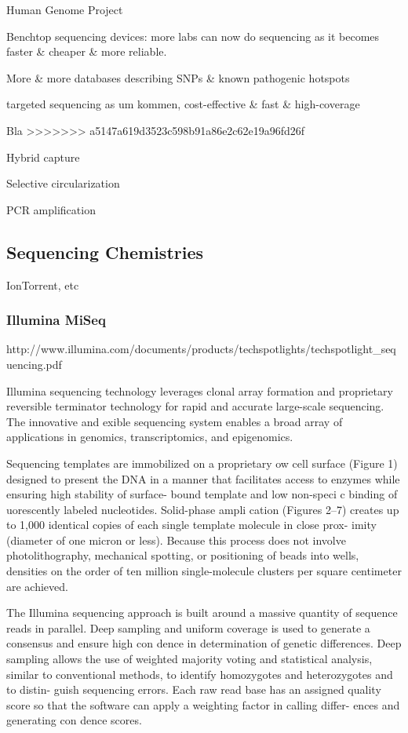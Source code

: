 Human Genome Project

Benchtop sequencing devices: more labs can now do sequencing as it becomes faster
& cheaper & more reliable. 

More & more databases describing SNPs & known pathogenic hotspots

targeted sequencing as um kommen, cost-effective & fast & high-coverage

Bla {\cite{enrichment_methods:2011}}
>>>>>>> a5147a619d3523c598b91a86e2c62e19a96fd26f

Hybrid capture

Selective circularization

PCR amplification

\subsection{Sequencing Chemistries}

IonTorrent, etc

\subsubsection{Illumina MiSeq}

http://www.illumina.com/documents/products/techspotlights/techspotlight_sequencing.pdf

Illumina sequencing technology leverages clonal array formation and proprietary reversible terminator technology for rapid and accurate large-scale sequencing. The innovative and  exible sequencing system enables a broad array of applications in genomics, transcriptomics, and epigenomics.

Sequencing templates are immobilized on a proprietary  ow cell surface (Figure 1) designed to present the DNA in a manner that facilitates access to enzymes while ensuring high stability of surface- bound template and low non-speci c binding of  uorescently labeled nucleotides. Solid-phase ampli cation (Figures 2–7) creates up to 1,000 identical copies of each single template molecule in close prox- imity (diameter of one micron or less). Because this process does not involve photolithography, mechanical spotting, or positioning of beads into wells, densities on the order of ten million single-molecule clusters per square centimeter are achieved.

The Illumina sequencing approach is built around a massive quantity of sequence reads in parallel. Deep sampling and uniform coverage is used to generate a consensus and ensure high con dence in determination of genetic differences. Deep sampling allows the use of weighted majority voting and statistical analysis, similar to conventional methods, to identify homozygotes and heterozygotes and to distin- guish sequencing errors. Each raw read base has an assigned quality score so that the software can apply a weighting factor in calling differ- ences and generating con dence scores.

